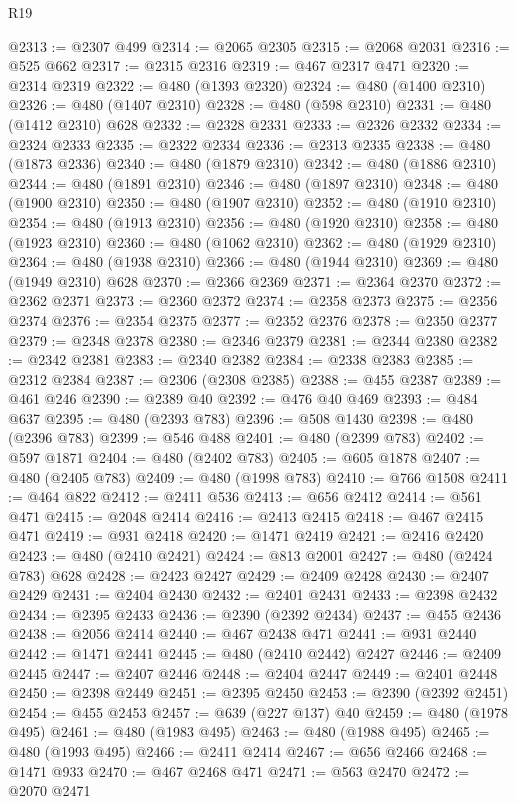 \begin{lexlean}{R19}
\begin{coremodule}
@2313 := @2307 @499
@2314 := @2065 @2305
@2315 := @2068 @2031
@2316 := @525 @662
@2317 := @2315 @2316
@2319 := @467 @2317 @471
@2320 := @2314 @2319
@2322 := @480 (@1393 @2320)
@2324 := @480 (@1400 @2310)
@2326 := @480 (@1407 @2310)
@2328 := @480 (@598 @2310)
@2331 := @480 (@1412 @2310) @628
@2332 := @2328 @2331
@2333 := @2326 @2332
@2334 := @2324 @2333
@2335 := @2322 @2334
@2336 := @2313 @2335
@2338 := @480 (@1873 @2336)
@2340 := @480 (@1879 @2310)
@2342 := @480 (@1886 @2310)
@2344 := @480 (@1891 @2310)
@2346 := @480 (@1897 @2310)
@2348 := @480 (@1900 @2310)
@2350 := @480 (@1907 @2310)
@2352 := @480 (@1910 @2310)
@2354 := @480 (@1913 @2310)
@2356 := @480 (@1920 @2310)
@2358 := @480 (@1923 @2310)
@2360 := @480 (@1062 @2310)
@2362 := @480 (@1929 @2310)
@2364 := @480 (@1938 @2310)
@2366 := @480 (@1944 @2310)
@2369 := @480 (@1949 @2310) @628
@2370 := @2366 @2369
@2371 := @2364 @2370
@2372 := @2362 @2371
@2373 := @2360 @2372
@2374 := @2358 @2373
@2375 := @2356 @2374
@2376 := @2354 @2375
@2377 := @2352 @2376
@2378 := @2350 @2377
@2379 := @2348 @2378
@2380 := @2346 @2379
@2381 := @2344 @2380
@2382 := @2342 @2381
@2383 := @2340 @2382
@2384 := @2338 @2383
@2385 := @2312 @2384
@2387 := @2306 (@2308 @2385)
@2388 := @455 @2387
@2389 := @461 @246
@2390 := @2389 @40
@2392 := @476 @40 @469
@2393 := @484 @637
@2395 := @480 (@2393 @783)
@2396 := @508 @1430
@2398 := @480 (@2396 @783)
@2399 := @546 @488
@2401 := @480 (@2399 @783)
@2402 := @597 @1871
@2404 := @480 (@2402 @783)
@2405 := @605 @1878
@2407 := @480 (@2405 @783)
@2409 := @480 (@1998 @783)
@2410 := @766 @1508
@2411 := @464 @822
@2412 := @2411 @536
@2413 := @656 @2412
@2414 := @561 @471
@2415 := @2048 @2414
@2416 := @2413 @2415
@2418 := @467 @2415 @471
@2419 := @931 @2418
@2420 := @1471 @2419
@2421 := @2416 @2420
@2423 := @480 (@2410 @2421)
@2424 := @813 @2001
@2427 := @480 (@2424 @783) @628
@2428 := @2423 @2427
@2429 := @2409 @2428
@2430 := @2407 @2429
@2431 := @2404 @2430
@2432 := @2401 @2431
@2433 := @2398 @2432
@2434 := @2395 @2433
@2436 := @2390 (@2392 @2434)
@2437 := @455 @2436
@2438 := @2056 @2414
@2440 := @467 @2438 @471
@2441 := @931 @2440
@2442 := @1471 @2441
@2445 := @480 (@2410 @2442) @2427
@2446 := @2409 @2445
@2447 := @2407 @2446
@2448 := @2404 @2447
@2449 := @2401 @2448
@2450 := @2398 @2449
@2451 := @2395 @2450
@2453 := @2390 (@2392 @2451)
@2454 := @455 @2453
@2457 := @639 (@227 @137) @40
@2459 := @480 (@1978 @495)
@2461 := @480 (@1983 @495)
@2463 := @480 (@1988 @495)
@2465 := @480 (@1993 @495)
@2466 := @2411 @2414
@2467 := @656 @2466
@2468 := @1471 @933
@2470 := @467 @2468 @471
@2471 := @563 @2470
@2472 := @2070 @2471

\end{coremodule}
\end{lexlean}
